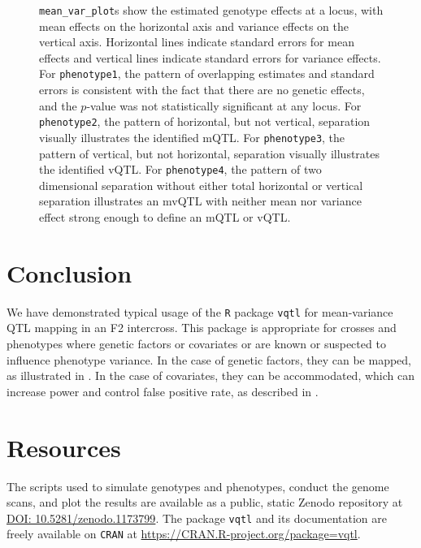 \documentclass[9pt,twocolumn,twoside]{gsag3jnl}
\begin{document}
\begin{figure}[t]
    \caption{
        \texttt{mean\_var\_plot}s show the estimated genotype effects at a locus, with mean effects on the horizontal axis and variance effects on the vertical axis.
        Horizontal lines indicate standard errors for mean effects and vertical lines indicate standard errors for variance effects.
        For \texttt{phenotype1}, the pattern of overlapping estimates and standard errors is consistent with the fact that there are no genetic effects, and the $p$-value was not statistically significant at any locus.
        For \texttt{phenotype2}, the pattern of horizontal, but not vertical, separation visually illustrates the identified mQTL.
        For \texttt{phenotype3}, the pattern of vertical, but not horizontal, separation visually illustrates the identified vQTL.
        For \texttt{phenotype4}, the pattern of two dimensional separation without either total horizontal or vertical separation illustrates an mvQTL with neither mean nor variance effect strong enough to define an mQTL or vQTL.
        \label{fig:mean_var_plots}
    }
\end{figure}






\section*{Conclusion}

We have demonstrated typical usage of the \texttt{R} package \texttt{vqtl} for mean-variance QTL mapping in an F2 intercross.
This package is appropriate for crosses and phenotypes where genetic factors or covariates or are known or suspected to influence phenotype variance.
In the case of genetic factors, they can be mapped, as illustrated in \CortyReanalysisPaper.
In the case of covariates, they can be accommodated, which can increase power and control false positive rate, as described in \CortyMethodsPaper.

\section*{Resources}
The scripts used to simulate genotypes and phenotypes, conduct the genome scans, and plot the results are available as a public, static Zenodo repository at \url{DOI: 10.5281/zenodo.1173799}.
The package \texttt{vqtl} and its documentation are freely available on \texttt{CRAN} at \url{https://CRAN.R-project.org/package=vqtl}.
\end{document}
